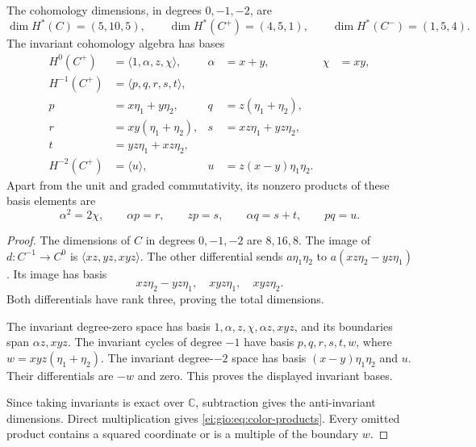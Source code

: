 \begin{theorem}\label{ei:gio:thm:color-cohomology}
The cohomology dimensions, in degrees $0,-1,-2$, are
\begin{equation}\label{ei:gio:eq:character-dimensions}
 \dim H^*(C)=(5,10,5),\qquad
 \dim H^*(C^+)=(4,5,1),\qquad
 \dim H^*(C^-)=(1,5,4).
\end{equation}
The invariant cohomology algebra has bases
\begin{align*}
 H^0(C^+)&=\langle1,\alpha,z,\chi\rangle,
             &\alpha&=x+y,&\chi&=xy,\\
 H^{-1}(C^+)&=\langle p,q,r,s,t\rangle,\\
 p&=x\eta_1+y\eta_2,&
 q&=z(\eta_1+\eta_2),\\
 r&=xy(\eta_1+\eta_2),&
 s&=xz\eta_1+yz\eta_2,\\
 t&=yz\eta_1+xz\eta_2,\\
 H^{-2}(C^+)&=\langle u\rangle,
             &u&=z(x-y)\eta_1\eta_2.
\end{align*}
Apart from the unit and graded commutativity, its
nonzero products of these basis elements are
\begin{equation}\label{ei:gio:eq:color-products}
 \alpha^2=2\chi,\qquad
 \alpha p=r,\qquad zp=s,\qquad
 \alpha q=s+t,\qquad pq=u.
\end{equation}
\end{theorem}

\begin{proof}
The dimensions of $C$ in degrees $0,-1,-2$ are
$8,16,8$. The image of $d:C^{-1}\to C^0$ is
$\langle xz,yz,xyz\rangle$.
The other differential sends $a\eta_1\eta_2$ to
$a(xz\eta_2-yz\eta_1)$. Its image has basis
\[
 xz\eta_2-yz\eta_1,\quad xyz\eta_1,\quad xyz\eta_2.
\]
Both differentials have rank three, proving the total
dimensions.

The invariant degree-zero space has basis
$1,\alpha,z,\chi,\alpha z,xyz$, and its boundaries
span $\alpha z,xyz$. The invariant cycles of degree
$-1$ have basis $p,q,r,s,t,w$, where
$w=xyz(\eta_1+\eta_2)$. The invariant degree-$-2$
space has basis $(x-y)\eta_1\eta_2$ and $u$.
Their differentials are $-w$ and zero. This proves
the displayed invariant bases.

Since taking invariants
is exact over $\mathbb C$, subtraction gives the
anti-invariant dimensions. Direct multiplication gives
\eqref{ei:gio:eq:color-products}. Every omitted product
contains a squared coordinate or is a multiple of the
boundary $w$.
\end{proof}

